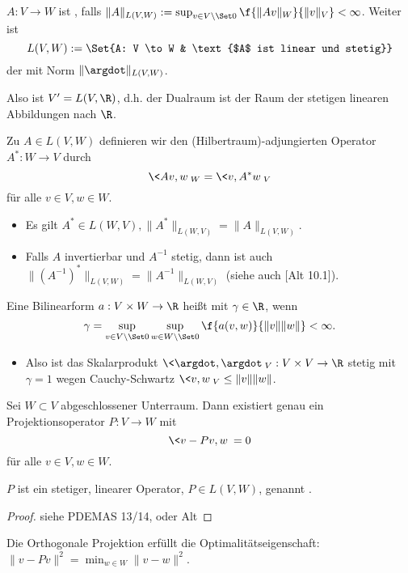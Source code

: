 \begin{df} \label{3.14}
	$A: V \to W$ ist , falls $\|A\|_{L(V,W)} := \sup_{v \in V\setminus \Set 0} \f{\|Av\|_W}{\|v\|_V} < \infty$.
	Weiter ist
	\[
		L(V,W) := \Set{A: V \to W & \text{$A$ ist linear und stetig}}
	\]
	der  mit Norm $\|\argdot\|_{L(V,W)}$.
	\begin{note}
		Also ist $V' = L(V, \R)$, d.h. der Dualraum ist der Raum der stetigen linearen Abbildungen nach $\R$.
	\end{note}
\end{df}

\begin{df} \label{3.15}
	Zu $A \in L(V,W)$ definieren wir den (Hilbertraum)-adjungierten Operator $A^*: W \to V$ durch
	\[
		\<Av,w\>_W = \<v,A^*w\>_V
	\]
	für alle $v \in V, w \in W$.
	\begin{note}
		\begin{itemize}
			\item
				Es gilt $A^* \in L(W,V), \|A^*\|_{L(W,V)} = \|A\|_{L(V,W)}$.
			\item
				Falls $A$ invertierbar und $A^{-1}$ stetig, dann ist auch $\|(A^{-1})^*\|_{L(V,W)} = \|A^{-1}\|_{L(W,V)}$ (siehe auch [Alt 10.1]).
		\end{itemize}
	\end{note}
\end{df}

\begin{df} \label{3.16}
	Eine Bilinearform $a: V \times W \to \R$ heißt  mit  $\gamma \in \R$, wenn
	\[
		\gamma = \sup_{v \in V\setminus \Set 0} \sup_{w \in W \setminus \Set 0} \f{a(v,w)}{\|v\|\|w\|} < \infty.
	\]
	\begin{note}
		\begin{itemize}
			\item
				Also ist das Skalarprodukt $\<\argdot, \argdot\>_V: V \times V \to \R$ stetig mit $\gamma = 1$ wegen Cauchy-Schwartz $\<v, w\>_V \le \|v\|\|w\|$.
		\end{itemize}
	\end{note}
\end{df}

\begin{st}[Projektionssatz] \label{3.17}
	Sei $W \subset V$ abgeschlossener Unterraum.
	Dann existiert genau ein Projektionsoperator $P: V \to W$ mit
	\[
		\<v - Pv, w\> = 0
	\]
	für alle $v \in V, w \in W$.

	$P$ ist ein stetiger, linearer Operator, $P \in L(V,W)$, genannt .
	\begin{proof}
		siehe PDEMAS 13/14, oder Alt
	\end{proof}
	\begin{note}
		Die Orthogonale Projektion erfüllt die Optimalitätseigenschaft: $\|v - Pv\|^2 = \min_{w\in W} \|v - w\|^2$.
	\end{note}
\end{st}

